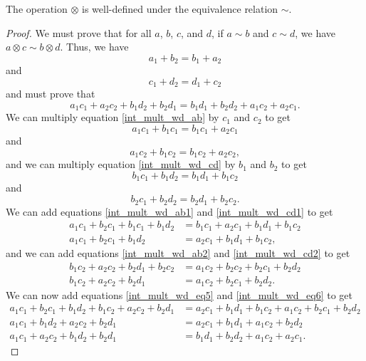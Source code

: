 \documentclass[../../math.tex]{subfiles}
\begin{document}
\begin{lemma}
    The operation $\otimes$ is well-defined under the equivalence relation
    $\sim$.
\end{lemma}
\begin{proof}
    We must prove that for all $a$, $b$, $c$, and $d$, if $a \sim b$ and $c \sim
    d$, we have $a \otimes c \sim b \otimes d$.  Thus, we have
    \begin{equation} \label{int_mult_wd_ab}
        a_1 + b_2 = b_1 + a_2
    \end{equation}
    and
    \begin{equation} \label{int_mult_wd_cd}
        c_1 + d_2 = d_1 + c_2
    \end{equation}
    and must prove that
    \[
        a_1c_1 + a_2c_2 + b_1d_2 + b_2d_1 =
        b_1d_1 + b_2d_2 + a_1c_2 + a_2c_1.
    \]
    We can multiply equation \ref{int_mult_wd_ab} by $c_1$ and $c_2$ to get
    \begin{equation} \label{int_mult_wd_ab1}
        a_1c_1 + b_1c_1 = b_1c_1 + a_2c_1
    \end{equation}
    and
    \begin{equation} \label{int_mult_wd_ab2}
        a_1c_2 + b_1c_2 = b_1c_2 + a_2c_2,
    \end{equation}
    and we can multiply equation \ref{int_mult_wd_cd} by $b_1$ and $b_2$ to get
    \begin{equation} \label{int_mult_wd_cd1}
        b_1c_1 + b_1d_2 = b_1d_1 + b_1c_2
    \end{equation}
    and
    \begin{equation} \label{int_mult_wd_cd2}
        b_2c_1 + b_2d_2 = b_2d_1 + b_2c_2.
    \end{equation}
    We can add equations \ref{int_mult_wd_ab1} and \ref{int_mult_wd_cd1} to get
    \begin{align}
        a_1c_1 + b_2c_1 + b_1c_1 + b_1d_2 &=
        b_1c_1 + a_2c_1 + b_1d_1 + b_1c_2 \nonumber \\
        a_1c_1 + b_2c_1 + b_1d_2 &= a_2c_1 + b_1d_1 + b_1c_2,
        \label{int_mult_wd_eq5}
    \end{align}
    and we can add equations \ref{int_mult_wd_ab2} and \ref{int_mult_wd_cd2} to
    get
    \begin{align}
        b_1c_2 + a_2c_2 + b_2d_1 + b_2c_2 &=
        a_1c_2 + b_2c_2 + b_2c_1 + b_2d_2 \nonumber \\
        b_1c_2 + a_2c_2 + b_2d_1 &= a_1c_2 + b_2c_1 + b_2d_2.
        \label{int_mult_wd_eq6}
    \end{align}
    We can now add equations \ref{int_mult_wd_eq5} and \ref{int_mult_wd_eq6} to
    get
    \begin{align*}
        a_1c_1 + b_2c_1 + b_1d_2 + b_1c_2 + a_2c_2 + b_2d_1 &=
        a_2c_1 + b_1d_1 + b_1c_2 + a_1c_2 + b_2c_1 + b_2d_2 \\
        a_1c_1 + b_1d_2 + a_2c_2 + b_2d_1 &=
        a_2c_1 + b_1d_1 + a_1c_2 + b_2d_2 \\
        a_1c_1 + a_2c_2 + b_1d_2 + b_2d_1 &=
        b_1d_1 + b_2d_2 + a_1c_2 + a_2c_1.
    \end{align*}
\end{proof}
\end{document}
